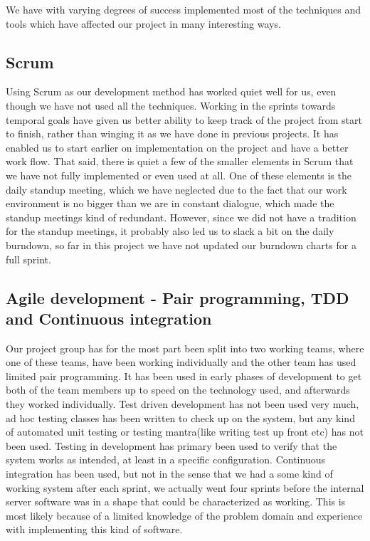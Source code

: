 We have with varying degrees of success implemented most of the techniques and tools which have affected our project in many interesting ways.

\subsection*{Scrum}
Using Scrum as our development method has worked quiet well for us, even though we have not used all the techniques. Working in the sprints towards temporal goals
have given us better ability to keep track of the project from start to finish, rather than winging it as we have done in previous projects.
It has enabled us to start earlier on implementation on the project and have a better work flow.
That said, there is quiet a few of the smaller elements in Scrum that we have not fully implemented or even used at all.
One of these elements is the daily standup meeting, which we have neglected due to the fact that our work environment is no bigger than we are in constant dialogue,
which made the standup meetings kind of redundant. However, since we did not have a tradition for the standup meetings, it probably also led us to slack
a bit on the daily burndown, so far in this project we have not updated our burndown charts for a full sprint.
 
\subsection*{Agile development - Pair programming, TDD and Continuous integration}
Our project group has for the most part been split into two working teams, where one of these teams, have been working individually and the other team has used limited pair programming.
It has been used in early phases of development to get both of the team members up to speed on the technology used, and afterwards they worked individually.
Test driven development has not been used very much, ad hoc testing classes has been written to check up on the system, but any kind of automated unit testing or testing mantra(like writing test up front etc)
has not been used. Testing in development has primary been used to verify that the system works as intended, at least in a specific configuration.
Continuous integration has been used, but not in the sense that we had a some kind of working system after each sprint, we actually went four sprints before the internal server software was in a shape
that could be characterized as working. This is most likely because of a limited knowledge of the problem domain and experience with implementing this kind of software.

